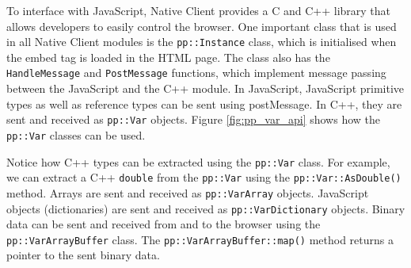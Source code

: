 To interface with JavaScript, Native Client provides a C and C++ library that allows developers to easily control the browser. One important class that is used in all Native Client modules is the \lstinline{pp::Instance} class, which is initialised when the embed tag is loaded in the HTML page. The class also has the \lstinline{HandleMessage} and \lstinline{PostMessage} functions, which implement message passing between the JavaScript and the C++ module. In JavaScript, JavaScript primitive types as well as reference types can be sent using postMessage. In C++, they are sent and received as \lstinline{pp::Var} objects. Figure \ref{fig:pp_var_api} shows how the \lstinline{pp::Var} classes can be used. 

Notice how C++ types can be extracted using the \lstinline{pp::Var} class. For example, we can extract a C++ \lstinline{double} from the \lstinline{pp::Var} using the \lstinline{pp::Var::AsDouble()} method. Arrays are sent and received as \lstinline{pp::VarArray} objects. JavaScript objects (dictionaries) are sent and received as \lstinline{pp::VarDictionary} objects. Binary data can be sent and received from and to the browser using the \lstinline{pp::VarArrayBuffer} class. The \lstinline{pp::VarArrayBuffer::map()} method returns a pointer to the sent binary data. 


